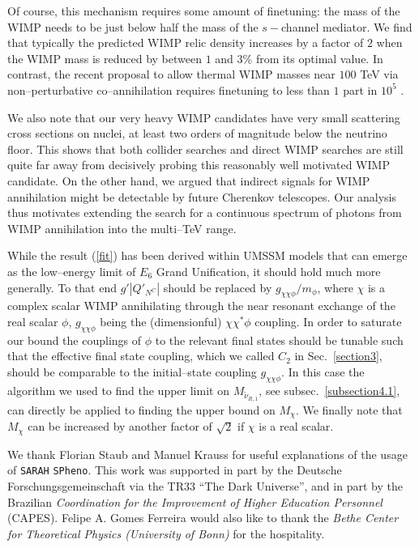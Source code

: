 \documentclass[a4paper,11pt]{article}
\begin{document}
Of course, this mechanism requires some amount of finetuning: the mass
of the WIMP needs to be just below half the mass of the $s-$channel
mediator. We find that typically the predicted WIMP relic density
increases by a factor of $2$ when the WIMP mass is reduced by between
$1$ and $3\%$ from its optimal value. In contrast, the recent proposal
to allow thermal WIMP masses near $100$ TeV via non--perturbative
co--annihilation requires finetuning to less than $1$ part in $10^5$
\cite{coan_new}.

We also note that our very heavy WIMP candidates have very small
scattering cross sections on nuclei, at least two orders of magnitude
below the neutrino floor. This shows that both collider searches and
direct WIMP searches are still quite far away from decisively probing
this reasonably well motivated WIMP candidate. On the other hand, we
argued that indirect signals for WIMP annihilation might be detectable
by future Cherenkov telescopes. Our analysis thus motivates extending
the search for a continuous spectrum of photons from WIMP annihilation
into the multi--TeV range.

While the result (\ref{fit}) has been derived within UMSSM models that
can emerge as the low--energy limit of $E_6$ Grand Unification, it
should hold much more generally. To that end $g' |Q'_{N^C}|$ should be
replaced by $g_{\chi \chi \phi}/m_\phi$, where $\chi$ is a complex
scalar WIMP annihilating through the near resonant exchange of the
real scalar $\phi$, $g_{\chi \chi \phi}$ being the (dimensionful)
$\chi \chi^* \phi$ coupling. In order to saturate our bound the
couplings of $\phi$ to the relevant final states should be tunable
such that the effective final state coupling, which we called $C_2$ in
Sec.~\ref{section3}, should be comparable to the initial--state
coupling $g_{\chi \chi \phi}$. In this case the algorithm we used to
find the upper limit on $M_{\tilde \nu_{R,1}}$, see
subsec.~\ref{subsection4.1}, can directly be applied to finding the
upper bound on $M_\chi$. We finally note that $M_\chi$ can be
increased by another factor of $\sqrt{2}$ if $\chi$ is a real scalar.


\acknowledgments

We thank Florian Staub and Manuel Krauss for useful explanations of
the usage of {\tt SARAH} {\tt SPheno}. This work was supported in part
by the Deutsche Forschungsgemeinschaft via the TR33 ``The Dark
Universe'', and in part by the Brazilian \emph{Coordination for the
  Improvement of Higher Education Personnel} (CAPES). Felipe A. Gomes
Ferreira would also like to thank the \emph{Bethe Center for
  Theoretical Physics (University of Bonn)} for the hospitality.
\end{document}

